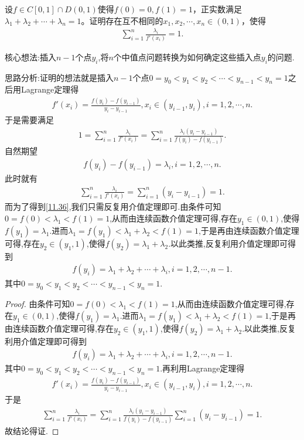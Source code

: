 \documentclass[../../main.tex]{subfiles}
\begin{document}
\begin{example}
设\(f\in C[0,1]\cap D(0,1)\)使得\(f(0)=0,f(1)=1\)，正实数满足\(\lambda_1 + \lambda_2 + \cdots + \lambda_n = 1\)。证明存在互不相同的\(x_1,x_2,\cdots,x_n\in(0,1)\)，使得
\begin{align*}
\sum_{i = 1}^{n}\frac{\lambda_i}{f'(x_i)} = 1.
\end{align*} 
\end{example}
\begin{note}
核心想法:插入$n-1$个点$y_i$,将$n$个中值点问题转换为如何确定这些插入点$y_i$的问题.
\end{note}
\begin{remark}
思路分析:证明的想法就是插入\(n - 1\)个点\(0 = y_0 < y_1 < y_2 < \cdots < y_{n - 1} < y_n = 1\)之后用Lagrange定理得
\begin{align*}
f'(x_i)=\frac{f(y_i)-f(y_{i - 1})}{y_i - y_{i - 1}},x_i\in(y_{i - 1},y_i),i = 1,2,\cdots,n.
\end{align*}
于是需要满足
\begin{align*}
1=\sum_{i = 1}^{n}\frac{\lambda_i}{f'(x_i)}=\sum_{i = 1}^{n}\frac{\lambda_i(y_i - y_{i - 1})}{f(y_i)-f(y_{i - 1})}.
\end{align*}
自然期望
\begin{align}
f(y_i)-f(y_{i - 1})=\lambda_i,i = 1,2,\cdots,n.\label{11.36}
\end{align}
此时就有
\begin{align*}
\sum_{i = 1}^{n}\frac{\lambda_i}{f'(x_i)}=\sum_{i = 1}^{n}(y_i - y_{i - 1}) = 1.
\end{align*}
而为了得到\eqref{11.36},我们只需反复用介值定理即可.由条件可知$0=f(0)<\lambda_1<f(1)=1$,从而由连续函数介值定理可得,存在$y_1\in (0,1)$,使得$f(y_1)=\lambda_1$.进而$\lambda_1=f(y_1)<\lambda_1+\lambda_2<f(1)=1$,于是再由连续函数介值定理可得,存在$y_2\in (y_1,1)$,使得$f(y_2)=\lambda_1+\lambda_2$.以此类推,反复利用介值定理即可得到
\begin{align*}
f(y_i)=\lambda_1+\lambda_2+\cdots+\lambda_i,i = 1,2,\cdots,n - 1.
\end{align*}
其中\(0 = y_0 < y_1 < y_2 < \cdots < y_{n - 1} < y_n = 1\).
\end{remark}
\begin{proof}
由条件可知$0=f(0)<\lambda_1<f(1)=1$,从而由连续函数介值定理可得,存在$y_1\in (0,1)$,使得$f(y_1)=\lambda_1$.进而$\lambda_1=f(y_1)<\lambda_1+\lambda_2<f(1)=1$,于是再由连续函数介值定理可得,存在$y_2\in (y_1,1)$,使得$f(y_2)=\lambda_1+\lambda_2$.以此类推,反复利用介值定理即可得到
\begin{align*}
f(y_i)=\lambda_1+\lambda_2+\cdots+\lambda_i,i = 1,2,\cdots,n - 1.
\end{align*}
其中\(0 = y_0 < y_1 < y_2 < \cdots < y_{n - 1} < y_n = 1\).再利用Lagrange定理得
\begin{align*}
f'(x_i)=\frac{f(y_i)-f(y_{i - 1})}{y_i - y_{i - 1}},x_i\in(y_{i - 1},y_i),i = 1,2,\cdots,n.
\end{align*}
于是
\begin{align*}
\sum_{i = 1}^{n}\frac{\lambda_i}{f'(x_i)}=\sum_{i = 1}^{n}\frac{\lambda_i(y_i - y_{i - 1})}{f(y_i)-f(y_{i - 1})}\sum_{i = 1}^{n}(y_i - y_{i - 1}) = 1.
\end{align*}
故结论得证.
\end{proof}
\end{document}
